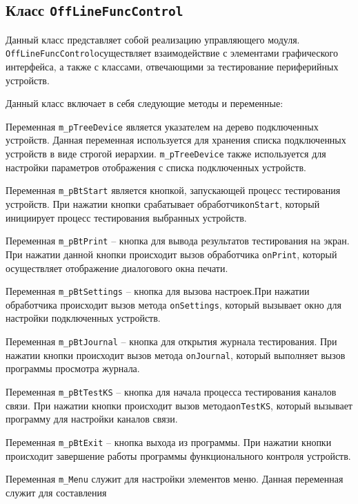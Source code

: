 \subsection{Класс \texttt{OffLineFuncControl}}
Данный класс представляет собой реализацию управляющего модуля. \texttt{OffLineFuncControl}осуществляет взаимодействие с элементами графического
интерфейса, а также с классами, отвечающими за тестирование периферийных устройств.

Данный класс включает в себя следующие методы и переменные:
\begin{enum}
	\item Переменная \texttt{m\_pTreeDevice} является указателем на дерево подключенных устройств. Данная переменная
		используется для хранения списка подключенных устройств в виде строгой иерархии.
		\texttt{m\_pTreeDevice} также используется для настройки параметров отображения с списка подключенных
		устройств.
	\item Переменная \texttt{m\_pBtStart} является кнопкой, запускающей процесс тестирования устройств. При нажатии
		кнопки срабатывает обработчик\break \texttt{onStart}, который инициирует процесс тестирования выбранных
		устройств.
	\item Переменная \texttt{m\_pBtPrint} -- кнопка для вывода результатов тестирования на экран. При нажатии данной
		кнопки происходит вызов обработчика \texttt{onPrint}, который осуществляет отображение диалогового окна
		печати.
	\item Переменная \texttt{m\_pBtSettings} -- кнопка для вызова настроек.\break При нажатии обработчика происходит вызов
		метода \texttt{onSettings}, который вызывает окно для настройки подключенных устройств.
	\item Переменная \texttt{m\_pBtJournal} -- кнопка для открытия журнала тестирования. При нажатии кнопки
		происходит вызов метода \texttt{onJournal}, который выполняет вызов программы просмотра журнала.
	\item Переменная \texttt{m\_pBtTestKS} -- кнопка для начала процесса тестирования каналов связи. При нажатии
		кнопки происходит вызов метода\break \texttt{onTestKS}, который вызывает программу для настройки каналов
		связи.
	\item Переменная \texttt{m\_pBtExit} -- кнопка выхода из программы. При нажатии кнопки происходит завершение
		работы программы функционального контроля устройств.
	\item Переменная \texttt{m\_Menu} служит для настройки элементов меню. Данная переменная служит для составления

\end{enum}
